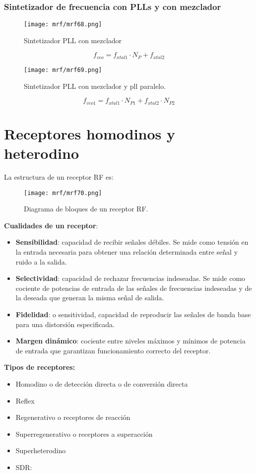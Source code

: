 \documentclass[
	12pt, %
	fleqn, %
	a4paper, %
	oneside, %
]{LegrandOrangeBook}
\begin{document}
\subsubsection{Sintetizador de frecuencia con PLLs y con mezclador}
\begin{figure}[H]
\centering
\texttt{[image: mrf/mrf68.png]}
\caption{Sintetizador PLL con mezclador}
\end{figure}
\begin{equation}
f_{vco}=f_{xtal1}\cdot N_P+f_{xtal2}
\end{equation}
\begin{figure}[H]
\centering
\texttt{[image: mrf/mrf69.png]}
\caption{Sintetizador PLL con mezclador y pll paralelo.}
\end{figure}
\begin{equation}
f_{vco1}=f_{xtal1}\cdot N_{P1}+f_{xtal2}\cdot N_{P2}
\end{equation}
\section{Receptores homodinos y heterodino}
La estructura de un receptor RF es:
\begin{figure}[H]
\centering
\texttt{[image: mrf/mrf70.png]}
\caption{Diagrama de bloques de un receptor RF.}
\end{figure}
\textbf{Cualidades de un receptor}:
\begin{itemize}
\item \textbf{Sensibilidad}: capacidad de recibir señales débiles. Se mide como tensión en la entrada necesaria para obtener una relación determinada entre señal y ruido a la salida.
\item \textbf{Selectividad}: capacidad de rechazar frecuencias indeseadas. Se mide como cociente de potencias de entrada de las señales de frecuencias indeseadas y de la deseada que generan la misma señal de salida.
\item \textbf{Fidelidad}: o sensitividad, capacidad de reproducir las señales de banda base para una distorsión especificada.
\item \textbf{Margen dinámico}: cociente entre niveles máximos y mínimos de potencia de entrada que garantizan funcionamiento correcto del receptor.
\end{itemize}
\textbf{Tipos de receptores:}
\begin{itemize}
\item Homodino o de detección directa o de conversión directa
\item Reflex
\item Regenerativo o receptores de reacción
\item Superregenerativo o receptores a superacción
\item Superheterodino
\item SDR:
\end{itemize}
\end{document}
